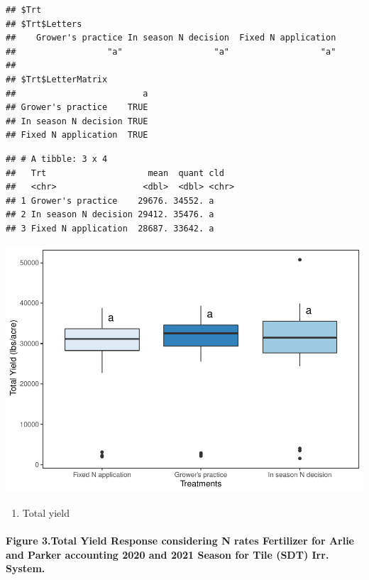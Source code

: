 \documentclass[
]{article}
\providecommand{\tightlist}{%
  \setlength{\itemsep}{0pt}\setlength{\parskip}{0pt}}
\begin{document}
\begin{verbatim}
## $Trt
## $Trt$Letters
##    Grower's practice In season N decision  Fixed N application 
##                  "a"                  "a"                  "a" 
## 
## $Trt$LetterMatrix
##                         a
## Grower's practice    TRUE
## In season N decision TRUE
## Fixed N application  TRUE
\end{verbatim}

\begin{verbatim}
## # A tibble: 3 x 4
##   Trt                    mean  quant cld  
##   <chr>                 <dbl>  <dbl> <chr>
## 1 Grower's practice    29676. 34552. a    
## 2 In season N decision 29412. 35476. a    
## 3 Fixed N application  28687. 33642. a
\end{verbatim}

\includegraphics{NoffsiteT_files/figure-latex/unnamed-chunk-4-1.pdf}

\begin{enumerate}
\def\labelenumi{\arabic{enumi}.}
\setcounter{enumi}{2}
\tightlist
\item
  Total yield
\end{enumerate}

\hypertarget{figure-3.total-yield-response-considering-n-rates-fertilizer-for-arlie-and-parker-accounting-2020-and-2021-season-for-tile-sdt-irr.-system.}{%
\paragraph{\texorpdfstring{\textbf{Figure 3.}Total Yield Response
considering N rates Fertilizer for Arlie and Parker accounting 2020 and
2021 Season for Tile (SDT) Irr.
System.}{Figure 3.Total Yield Response considering N rates Fertilizer for Arlie and Parker accounting 2020 and 2021 Season for Tile (SDT) Irr. System.}}\label{figure-3.total-yield-response-considering-n-rates-fertilizer-for-arlie-and-parker-accounting-2020-and-2021-season-for-tile-sdt-irr.-system.}}
\end{document}

